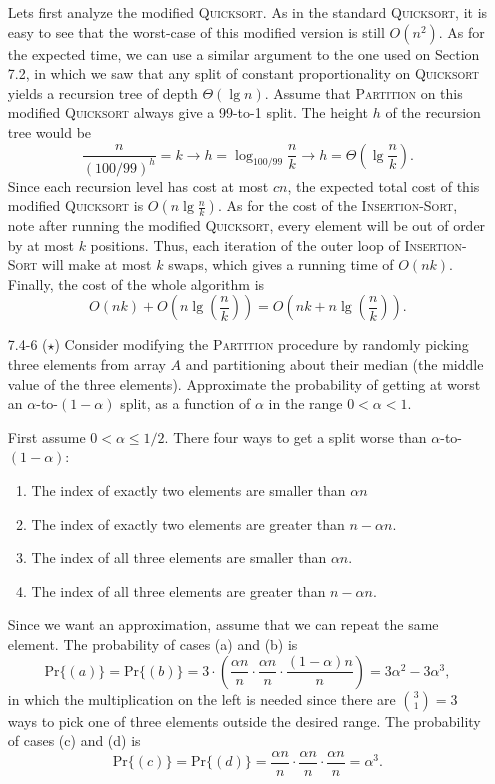 \documentclass{report}
\makeatletter
\renewenvironment{framed}{%
 \def\FrameCommand##1{\hskip\@totalleftmargin
 \fboxsep=\FrameSep\fbox{##1}}%
 \MakeFramed {\advance\hsize-\width
   \@totalleftmargin\z@ \linewidth\hsize
   \@setminipage}}%
 {\par\unskip\endMakeFramed}
\makeatother
\begin{document}
\begin{enumerate}
\begin{framed}
Lets first analyze the modified \textsc{Quicksort}. As in the standard
\textsc{Quicksort}, it is easy to see that the worst-case of this modified
version is still $O(n^2)$. As for the expected time, we can use a similar
argument to the one used on Section 7.2, in which we saw that any split of
constant proportionality on \textsc{Quicksort} yields a recursion tree of
depth $\Theta(\lg n)$. Assume that \textsc{Partition} on this modified
\textsc{Quicksort} always give a 99-to-1 split. The height $h$ of the recursion
tree would be
\[
  \frac{n}{(100/99)^h} = k \rightarrow h = \log_{100/99} \frac{n}{k} \rightarrow h = \Theta\left(\lg \frac{n}{k}\right).
\]
Since each recursion level has cost at most $cn$, the expected total cost of
this modified \textsc{Quicksort} is $O(n \lg \frac{n}{k})$. As for the cost of
the \textsc{Insertion-Sort}, note after running the modified \textsc{Quicksort},
every element will be out of order by at most $k$ positions. Thus, each
iteration of the outer loop of \textsc{Insertion-Sort} will make at most $k$
swaps, which gives a running time of $O(nk)$. Finally, the cost of the whole
algorithm is
\[
  O(nk) + O\left(n \lg \left(\frac{n}{k}\right)\right) = O\left(nk + n \lg \left(\frac{n}{k}\right)\right).
\]
\end{framed}

\newpage

\item[7.4{-}6]{($\star$) Consider modifying the \textsc{Partition} procedure by
randomly picking three elements from array $A$ and partitioning about their
median (the middle value of the three elements). Approximate the probability of
getting at worst an $\alpha$-to-$(1 - \alpha)$ split, as a function of
$\alpha$ in the range $0 < \alpha < 1$.}

\begin{framed}
First assume $0 < \alpha \le 1/2$. There four ways to get a split worse than
$\alpha$-to-$(1 - \alpha)$:
\begin{enumerate}
  \item The index of exactly two elements are smaller than $\alpha n$
  \item The index of exactly two elements are greater than $n - \alpha n$.
  \item The index of all three elements are smaller than $\alpha n$.
  \item The index of all three elements are greater than $n - \alpha n$.
\end{enumerate}
Since we want an approximation, assume that we can repeat the same element. The
probability of cases (a) and (b) is
\[
  \text{Pr}\{(a)\} = \text{Pr}\{(b)\} =
  3 \cdot \left(\frac{\alpha n}{n} \cdot \frac{\alpha n}{n} \cdot
                \frac{(1 - \alpha) n}{n}\right) =
  3 \alpha^2 - 3 \alpha^3,
\]
in which the multiplication on the left is needed since there are
$\binom{3}{1} = 3$ ways to pick one of three elements outside the desired range.
The probability of cases (c) and (d) is
\[
  \text{Pr}\{(c)\} = \text{Pr}\{(d)\} =
  \frac{\alpha n}{n} \cdot \frac{\alpha n}{n} \cdot \frac{\alpha n}{n} =
  \alpha^3.
\]


\end{framed}
\end{enumerate}
\end{document}

